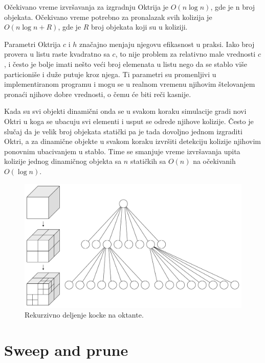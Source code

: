 \documentclass[12pt,oneside]{memoir}
\begin{document}
Očekivano vreme izvršavanja za izgradnju Oktrija je $O(n \log n)$, gde je n broj objekata.
Očekivano vreme potrebno za pronalazak svih kolizija je $O(n \log n + R)$, gde je $R$ broj objekata koji su u koliziji.

Parametri Oktrija $c$ i $h$ značajno menjaju njegovu efikasnost u praksi. 
Iako broj provera u listu raste kvadratno sa $c$, to nije problem za relativno male vrednosti $c$, i često je bolje 
imati nešto veći broj elemenata u listu nego da se stablo više particioniše i duže putuje kroz njega.
Ti parametri su promenljivi u implementiranom programu i mogu se u realnom vremenu njihovim štelovanjem pronaći 
njihove dobre vrednosti, o čemu će biti reči kasnije.

Kada su svi objekti dinamični onda se u svakom koraku simulacije  gradi novi Oktri u
koga se ubacuju svi elementi i usput se odrede njihove kolizije. Često je slučaj da je velik 
broj objekata statički pa je tada dovoljno jednom izgraditi Oktri, a za dinamične objekte u svakom koraku 
izvršiti detekciju kolizije njihovim ponovnim ubacivanjem u stablo. Time se smanjuje vreme izvršavanja upita 
kolizije jednog dinamičnog objekta sa $n$ statičkih sa $O(n)$ na očekivanih $O(\log n)$.

\begin{figure}[h!]
	\begin{center}
	\includegraphics[scale=0.22]{octree.png}
	\end{center}
	\caption{Rekurzivno deljenje kocke na oktante.}
	\label{fig:oct}
\end{figure}

\section{Sweep and prune}
\label{subsec:sap}
\end{document}
